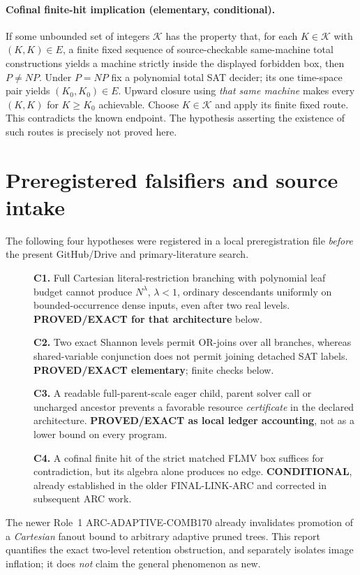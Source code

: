 \documentclass[11pt]{article}
\begin{document}
\paragraph{Cofinal finite-hit implication (elementary, conditional).}
If some unbounded set of integers $\mathcal K$ has the property that, for each
$K\in\mathcal K$ with $(K,K)\in E$, a finite fixed sequence of source-checkable same-machine total constructions yields a machine strictly inside the displayed forbidden box, then $P\ne NP$. Under $P=NP$ fix a polynomial total SAT decider; its one time-space pair yields $(K_0,K_0)\in E$. Upward closure using \emph{that same machine} makes every $(K,K)$ for $K\ge K_0$ achievable. Choose $K\in\mathcal K$ and apply its finite fixed route. This contradicts the known endpoint. The hypothesis asserting the existence of such routes is precisely not proved here.

\section{Preregistered falsifiers and source intake}
The following four hypotheses were registered in a local preregistration file \emph{before} the present GitHub/Drive and primary-literature search.
\begin{description}
\item[] \textbf{C1.} Full Cartesian literal-restriction branching with polynomial leaf budget cannot produce $N^\lambda$, $\lambda<1$, ordinary descendants uniformly on bounded-occurrence dense inputs, even after two real levels. \textbf{PROVED/EXACT for that architecture} below.
\item[] \textbf{C2.} Two exact Shannon levels permit OR-joins over all branches, whereas shared-variable conjunction does not permit joining detached SAT labels. \textbf{PROVED/EXACT elementary}; finite checks below.
\item[] \textbf{C3.} A readable full-parent-scale eager child, parent solver call or uncharged ancestor prevents a favorable resource \emph{certificate} in the declared architecture. \textbf{PROVED/EXACT as local ledger accounting}, not as a lower bound on every program.
\item[] \textbf{C4.} A cofinal finite hit of the strict matched FLMV box suffices for contradiction, but its algebra alone produces no edge. \textbf{CONDITIONAL}, already established in the older FINAL-LINK-ARC and corrected in subsequent ARC work.
\end{description}
The newer Role~1 ARC-ADAPTIVE-COMB170 already invalidates promotion of a \emph{Cartesian} fanout bound to arbitrary adaptive pruned trees. This report quantifies the exact two-level retention obstruction, and separately isolates image inflation; it does \emph{not} claim the general phenomenon as new.
\end{document}
